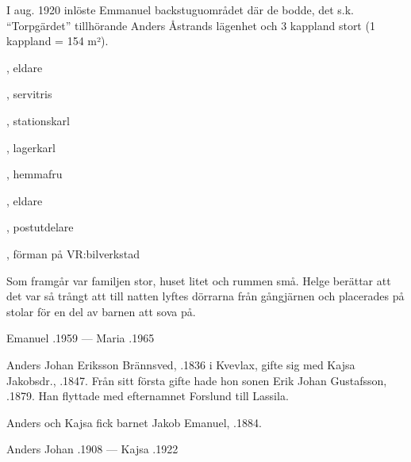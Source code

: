 I aug. 1920 inlöste Emmanuel backstuguområdet där de bodde, det s.k. ``Torpgärdet'' tillhörande Anders Åstrands lägenhet och 3 kappland stort (1 kappland = 154 m²).
\begin{jhchildren}
  \item {}, eldare
  \item {}
  \item {}, servitris
  \item {}, stationskarl
  \item {}, lagerkarl
  \item {}, hemmafru
  \item {}, eldare
  \item {}, postutdelare
  \item {}, förman på VR:bilverkstad
\end{jhchildren}

Som framgår var familjen stor, huset litet och rummen små. Helge berättar att det var så trångt att till natten lyftes dörrarna från gångjärnen och placerades på stolar för en del av barnen att  sova på.

Emanuel .1959  ---  Maria .1965


%
Anders Johan Eriksson Brännsved, .1836 i Kvevlax, gifte sig med Kajsa Jakobsdr., .1847. Från sitt första gifte hade hon sonen Erik Johan Gustafsson, .1879. Han flyttade med efternamnet  Forslund till Lassila.

Anders och Kajsa fick barnet Jakob Emanuel, .1884.

Anders Johan .1908  ---  Kajsa .1922



%


